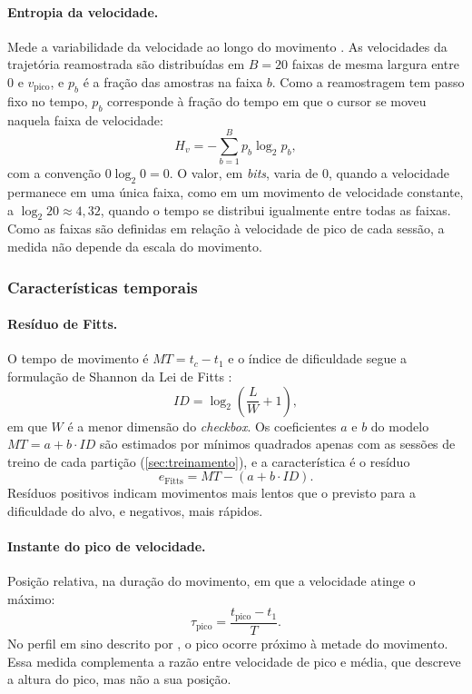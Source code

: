 \paragraph{Entropia da velocidade.} Mede a variabilidade da velocidade ao longo do movimento \cite{shannon1948}. As velocidades da trajetória reamostrada são distribuídas em $B = 20$ faixas de mesma largura entre 0 e $v_{\text{pico}}$, e $p_b$ é a fração das amostras na faixa $b$. Como a reamostragem tem passo fixo no tempo, $p_b$ corresponde à fração do tempo em que o cursor se moveu naquela faixa de velocidade:
\begin{equation}
    H_v = -\sum_{b=1}^{B} p_b \log_2 p_b ,
\end{equation}
com a convenção $0 \log_2 0 = 0$. O valor, em \textit{bits}, varia de 0, quando a velocidade permanece em uma única faixa, como em um movimento de velocidade constante, a $\log_2 20 \approx 4{,}32$, quando o tempo se distribui igualmente entre todas as faixas. Como as faixas são definidas em relação à velocidade de pico de cada sessão, a medida não depende da escala do movimento.

\subsubsection{Características temporais}

\paragraph{Resíduo de Fitts.} O tempo de movimento é $MT = t_c - t_1$ e o índice de dificuldade segue a formulação de Shannon da Lei de Fitts \cite{fitts1954, mackenzie1992}:
\begin{equation}
    ID = \log_2\left( \frac{L}{W} + 1 \right) ,
\end{equation}
em que $W$ é a menor dimensão do \textit{checkbox}. Os coeficientes $a$ e $b$ do modelo $MT = a + b \cdot ID$ são estimados por mínimos quadrados apenas com as sessões de treino de cada partição (\autoref{sec:treinamento}), e a característica é o resíduo
\begin{equation}
    e_{\text{Fitts}} = MT - (a + b \cdot ID) .
\end{equation}
Resíduos positivos indicam movimentos mais lentos que o previsto para a dificuldade do alvo, e negativos, mais rápidos.

\paragraph{Instante do pico de velocidade.} Posição relativa, na duração do movimento, em que a velocidade atinge o máximo:
\begin{equation}
    \tau_{\text{pico}} = \frac{t_{\text{pico}} - t_1}{T} .
\end{equation}
No perfil em sino descrito por , o pico ocorre próximo à metade do movimento. Essa medida complementa a razão entre velocidade de pico e média, que descreve a altura do pico, mas não a sua posição.

